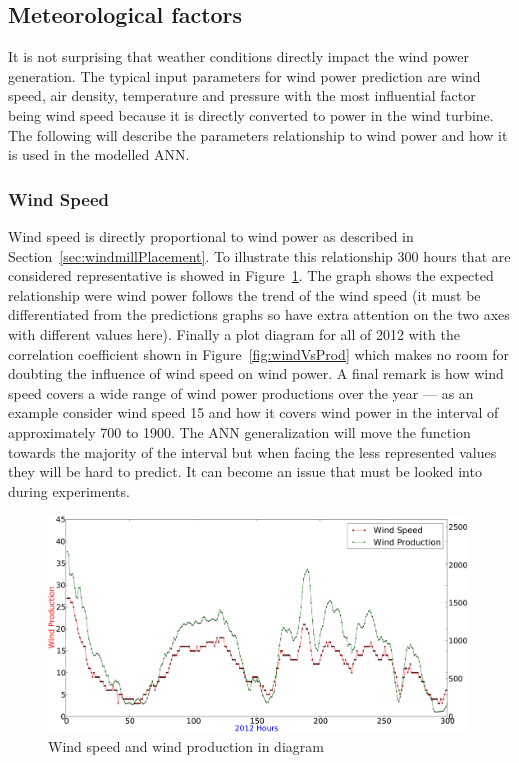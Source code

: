 \subsection{Meteorological factors}
It is not surprising that weather conditions directly impact the wind power generation. The typical input parameters for wind power prediction are wind speed, air density, temperature and pressure \cite{WindPowerGenerationUsingANN} with the most influential factor being wind speed because it is directly converted to power in the wind turbine. The following will describe the parameters relationship to wind power and how it is used in the modelled ANN.

\subsubsection{Wind Speed}
\label{sec:windPowerWindSpeed}
Wind speed is directly proportional to wind power as described in Section~\ref{sec:windmillPlacement}. To illustrate this relationship 300 hours that are considered representative is showed in Figure~\ref{fig:windSpeedWindProductionPlot}.  The graph shows the expected relationship were wind power follows the trend of the wind speed (it must be differentiated from the predictions graphs so have extra attention on the two axes with different values here). Finally a plot diagram for all of 2012 with the correlation coefficient shown in Figure~\ref{fig:windVsProd} which makes no room for doubting the influence of wind speed on wind power. A final remark is how wind speed covers a wide range of wind power productions over the year --- as an example consider wind speed 15 and how it covers wind power in the interval of approximately 700 to 1900. The ANN generalization will move the function towards the majority of the interval but when facing the less represented values they will be hard to predict. It can become an issue that must be looked into during experiments.  

\begin{figure}[h!]
\centering
\includegraphics[width=0.99\textwidth]{billeder/windSpeedWindProductionPlot.png}
\caption{Wind speed and wind production in diagram}
\label{fig:windSpeedWindProductionPlot}
\end{figure}

